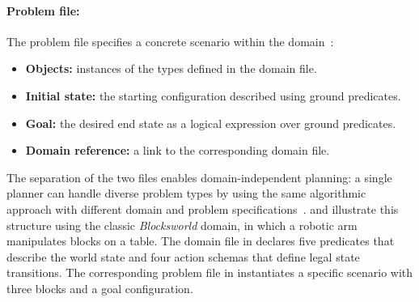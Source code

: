 \paragraph{Problem file:}
The problem file specifies a concrete scenario within the domain~\cite{McDermott1998}:
\begin{itemize}
  \item \textbf{Objects:} instances of the types defined in the domain file.
  \item \textbf{Initial state:} the starting configuration described using ground predicates.
  \item \textbf{Goal:} the desired end state as a logical expression over ground predicates.
  \item \textbf{Domain reference:} a link to the corresponding domain file.
\end{itemize}

The separation of the two files enables domain-independent planning: a single planner can handle diverse problem types by using the same algorithmic approach with different domain and problem specifications~\cite{GhallabNauTraverso2004}.
 and  illustrate this structure using the classic \emph{Blocksworld} domain, in which a robotic arm manipulates blocks on a table.
The domain file in  declares five predicates that describe the world state and four action schemas that define legal state transitions.
The corresponding problem file in  instantiates a specific scenario with three blocks and a goal configuration.

